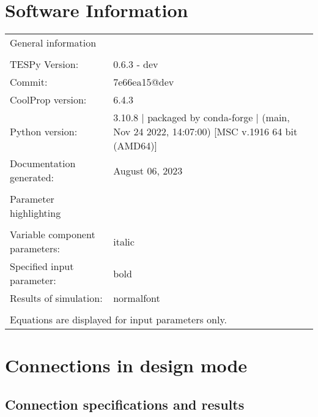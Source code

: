 \documentclass[]{article}
\newcommand{\iftab}{\fontshape{sl}\selectfont}
\newcommand{\bftab}{\fontseries{b}\selectfont}
\begin{document}
\section*{Software Information}

\begin{table}[H]
\begin{tabular}{ll}
\bftab General information&\\
& \\
TESPy Version:&0.6.3 - dev\\
Commit:&7e66ea15@dev\\
CoolProp version:&6.4.3\\
Python version:&3.10.8 | packaged by conda-forge | (main, Nov 24 2022, 14:07:00) [MSC v.1916 64 bit (AMD64)]\\
Documentation generated:&August 06, 2023\\
& \\
\bftab Parameter highlighting&\\
& \\
Variable component parameters:& \iftab italic\\
Specified input parameter:& \bftab bold\\
Results of simulation:& normalfont \\
& \\
\multicolumn{2}{l}{\iftab Equations are displayed for input parameters only.}\\
\end{tabular}
\end{table}
\newpage\section{Connections in design mode}

\subsection{Connection specifications and results}
\end{document}
